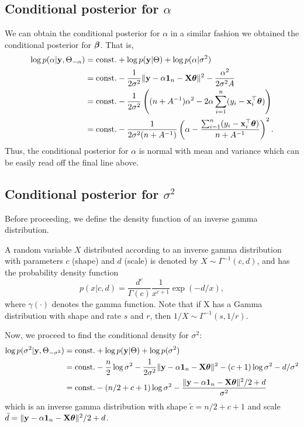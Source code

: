 \subsection{Conditional posterior for $\alpha$}

We can obtain the conditional posterior for $\alpha$ in a similar fashion we obtained the conditional posterior for $\bbeta$. 
That is,
\begin{align*}
  \log p(\alpha|\by,\Theta_{-\alpha}) 
  &= \const + \log p(\by|\Theta) + \log p(\alpha|\sigma^2) \\
  &= \const - \frac{1}{2\sigma^2} \Vert \by - \alpha \bone_n - \bX\btheta \Vert^2  
  - \frac{\alpha^2}{2\sigma^2A} \\
  &= \const - \frac{1}{2\sigma^2} \left( (n+A^{-1})\alpha^2 - 2\alpha\sum_{i=1}^n(y_i - \bx_i^\top\btheta) \right) \\
  &= \const - \frac{1}{2\sigma^2(n+A^{-1})} \left( \alpha - \frac{\sum_{i=1}^n(y_i - \bx_i^\top\btheta)}{n+A^{-1}}  \right)^2.
\end{align*}
Thus, the conditional posterior for $\alpha$ is normal with mean and variance which can be easily read off the final line above.

\subsection{Conditional posterior for $\sigma^2$}

Before proceeding, we define the density function of an inverse gamma distribution.

\begin{definition}\label{def:invgam}
  A random variable $X$ distributed according to an inverse gamma distribution with parameters $c$ (shape) and $d$ (scale) is denoted by $X\sim\Gamma^{-1}(c,d)$, and has the probability density function 
  \[
    p(x|c,d) = \frac{d^c}{\Gamma(c)} \frac{1}{x^{c+1}}\exp(-d/x),
  \]
  where $\gamma(\cdot)$ denotes the gamma function.
  Note that if X has a Gamma distribution with shape and rate $s$ and $r$, then $1/X \sim \Gamma^{-1}(s,1/r)$.
\end{definition}

Now, we proceed to find the conditional density for $\sigma^2$:
\begin{align*}
  \log p(\sigma^2|\by,\Theta_{-\sigma^2}) 
  &= \const + \log p(\by|\Theta) + \log p(\sigma^2) \\
  &= \const - \half[n]\log\sigma^2 - \frac{1}{2\sigma^2} \Vert \by - \alpha \bone_n - \bX\btheta \Vert^2 - (c+1)\log\sigma^2 - d / \sigma^2 \\
  &= \const - (n/2 + c + 1)\log\sigma^2 - \frac{\Vert \by - \alpha \bone_n - \bX\btheta \Vert^2/2 + d}{\sigma^2}
\end{align*}
which is an inverse gamma distribution with shape $\tilde c = n/2 + c + 1$ and scale $\tilde d = \Vert \by - \alpha \bone_n - \bX\btheta \Vert^2/2 + d$.

